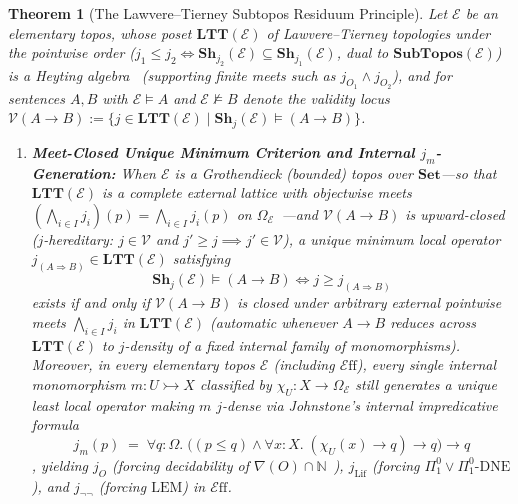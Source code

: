 \documentclass[10pt,twoside,openright]{book}
\theoremstyle{crmplain}
\newtheorem{theorem}{Theorem}[section]
\theoremstyle{crmdef}
\theoremstyle{crmremark}
\newcommand{\Eff}{\mathcal{E}\mathrm{ff}}
\begin{document}
\begin{theorem}[The Lawvere--Tierney Subtopos Residuum Principle]\label{thm:ltt-residuum}%
%
Let $\mathcal{E}$ be an elementary topos, whose poset $\mathbf{LTT}(\mathcal{E})$ of Lawvere--Tierney topologies under the pointwise order ($j_1 \le j_2 \iff \mathbf{Sh}_{j_2}(\mathcal{E}) \subseteq \mathbf{Sh}_{j_1}(\mathcal{E})$, dual to $\mathbf{SubTopos}(\mathcal{E})$) is a Heyting algebra~\cite[\S A4.5]{Johnstone02} (supporting finite meets such as $j_{O_1} \wedge j_{O_2}$), and for sentences $A, B$ with $\mathcal{E} \models A$ and $\mathcal{E} \not\models B$ denote the validity locus $\mathcal{V}(A \to B) := \{j \in \mathbf{LTT}(\mathcal{E}) \mid \mathbf{Sh}_j(\mathcal{E}) \models (A \to B)\}$.
\begin{enumerate}[label=(\roman*),leftmargin=2em]

  \item \textbf{Meet-Closed Unique Minimum Criterion and Internal $j_m$-Generation:} When $\mathcal{E}$ is a Grothendieck (bounded) topos over $\mathbf{Set}$---so that $\mathbf{LTT}(\mathcal{E})$ is a complete external lattice with objectwise meets $(\bigwedge_{i \in I} j_i)(p) = \bigwedge_{i \in I} j_i(p)$ on $\Omega_{\mathcal{E}}$~\cite[\S A4.5]{Johnstone02}---and $\mathcal{V}(A \to B)$ is upward-closed ($j$-hereditary: $j \in \mathcal{V}$ and $j' \ge j \implies j' \in \mathcal{V}$), a unique minimum local operator $j_{(A \Rightarrow B)} \in \mathbf{LTT}(\mathcal{E})$ satisfying
  \[
    \mathbf{Sh}_j(\mathcal{E}) \models (A \to B) \iff j \ge j_{(A \Rightarrow B)}
  \]
  exists if and only if $\mathcal{V}(A \to B)$ is closed under arbitrary external pointwise meets $\bigwedge_{i \in I} j_i$ in $\mathbf{LTT}(\mathcal{E})$ (automatic whenever $A \to B$ reduces across $\mathbf{LTT}(\mathcal{E})$ to $j$-density of a fixed internal family of monomorphisms). Moreover, in \emph{every} elementary topos $\mathcal{E}$ (including $\Eff$), every single internal monomorphism $m : U \rightarrowtail X$ classified by $\chi_U : X \to \Omega_{\mathcal{E}}$ still generates a unique least local operator making $m$ $j$-dense via Johnstone's internal impredicative formula
  \[
    j_m(p) \;=\; \forall q : \Omega.\; \bigl((p \le q) \wedge \forall x : X.\; (\chi_U(x) \to q) \to q\bigr) \to q
  \]
  \cite[A4.5]{Johnstone02}, yielding $j_O$ (forcing decidability of $\nabla(O) \cap \mathbb{N}$~\cite{LeeVanOosten13}), $j_{\mathrm{Lif}}$ (forcing $\Pi^0_1 \lor \Pi^0_1\text{-}\mathrm{DNE}$), and $j_{\neg\neg}$ (forcing $\mathrm{LEM}$) in $\Eff$.


\end{enumerate}
\end{theorem}
\end{document}

